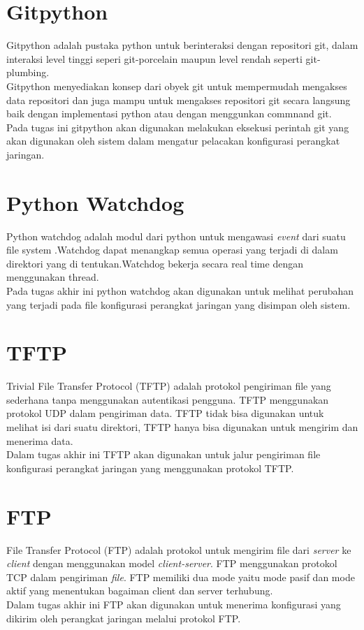        	\section{Gitpython}
            Gitpython adalah pustaka python untuk berinteraksi dengan repositori git, dalam interaksi level tinggi seperi git-porcelain maupun level rendah seperti git-plumbing.\\ 
            \indent Gitpython menyediakan konsep dari obyek git untuk mempermudah mengakses data repositori dan juga mampu untuk mengakses repositori git secara langsung baik dengan implementasi python atau dengan menggunkan commnand git.\cite{about_gitpython} \\
            \indent Pada tugas ini gitpython akan digunakan melakukan eksekusi perintah git yang akan digunakan oleh sistem dalam mengatur pelacakan konfigurasi perangkat jaringan.\\
            
        \section{Python Watchdog}
            Python watchdog adalah modul dari python untuk mengawasi \textit{event} dari suatu file system .Watchdog dapat menangkap semua operasi yang terjadi di dalam direktori yang di tentukan.Watchdog bekerja secara real time dengan menggunakan thread.\cite{watchdog_python} \\     
            \indent Pada tugas akhir ini python watchdog akan digunakan untuk melihat perubahan yang terjadi pada file konfigurasi perangkat jaringan yang disimpan oleh sistem.\\
        
        \section{TFTP}
        	Trivial File Transfer Protocol (TFTP) adalah protokol pengiriman file yang sederhana tanpa menggunakan autentikasi pengguna. TFTP menggunakan protokol UDP dalam pengiriman data. TFTP tidak bisa digunakan untuk melihat isi dari suatu direktori, TFTP hanya bisa digunakan untuk mengirim dan menerima data.\cite{tftp}\\
        	\indent Dalam tugas akhir ini TFTP akan digunakan untuk jalur pengiriman file konfigurasi perangkat jaringan yang menggunakan protokol TFTP.
        	
        \section{FTP}
        	File Transfer Protocol (FTP) adalah protokol untuk mengirim file dari \textit{server} ke \textit{client} dengan menggunakan model \textit{client-server}. FTP menggunakan protokol TCP dalam pengiriman \textit{file}. FTP memiliki dua mode yaitu mode pasif dan mode aktif yang menentukan bagaiman client dan server terhubung.\cite{ftp}\\
        	\indent Dalam tugas akhir ini FTP akan digunakan untuk menerima konfigurasi yang dikirim oleh perangkat jaringan melalui protokol FTP.
        	
